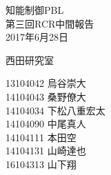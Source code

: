 \begin{titlepage}

  \vspace*{25mm}

  \begin{center}
    {\huge 知能制御PBL\\}
    \vspace{5mm}
    {\Huge 第三回RCR中間報告\\}
    \vspace{20mm}
    {\Large 2017年6月28日}

    \vspace{25mm}

    {\LARGE 西田研究室\\}

    \vspace{10mm}

    {\Large
   13104042 烏谷崇大　　\\
   14104043 桑野僚大　　\\
   14104034 下松八重宏太\\
   14104090 中尾真人　　\\
   14104111 本田空　　　\\
   14104131 山崎達也　　\\
   16104313 山下翔　　　\\
}

  \end{center}

\end{titlepage}
